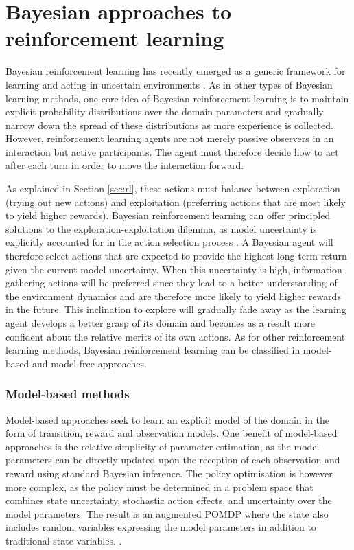 \section{Bayesian approaches to reinforcement learning}
\label{sec:brl}

Bayesian reinforcement learning has recently emerged as a generic framework for learning and acting in uncertain environments \citep{poupart2008,Ross:2011,brl2012}. As in other types of Bayesian learning methods, one core idea of Bayesian reinforcement learning is to maintain explicit probability distributions over the domain parameters and gradually narrow down the spread of these distributions as more experience is collected. However, reinforcement learning agents are not merely passive observers in an interaction but active participants.  The agent must therefore decide how to act after each turn in order to move the interaction forward. 

As explained in Section \ref{sec:rl}, these actions must balance between exploration (trying out new actions) and exploitation (preferring actions that are most likely to yield higher rewards). Bayesian reinforcement learning can offer principled solutions to the exploration-exploitation dilemma, as model uncertainty is explicitly accounted for in the action selection process \citep{Duff:2002,Ross:2011}.  A Bayesian agent will therefore select actions that are expected to provide the highest long-term return given the current model uncertainty. When this uncertainty is high, information-gathering actions will be preferred since they lead to a better understanding of the environment dynamics and are therefore more likely to yield higher rewards in the future. This inclination to explore will gradually fade away as the learning agent develops a better grasp of its domain and becomes as a result more confident about the relative merits of its own actions.
As for other reinforcement learning methods, Bayesian reinforcement learning can be classified in model-based and model-free approaches. 


\subsubsection*{Model-based methods}

Model-based approaches seek to learn an explicit model of the domain in the form of transition, reward and observation models.  One benefit of model-based approaches is the relative simplicity of parameter estimation, as the model parameters can be directly updated upon the reception of each observation and reward using standard Bayesian inference. The policy optimisation is however more complex, as the policy must be determined in a problem space that combines state uncertainty, stochastic action effects, and uncertainty over the model parameters.  The result is an augmented POMDP where the state also includes random variables expressing the model parameters in addition to traditional state variables. \citep{Duff:2002,Ross:2011}. 


